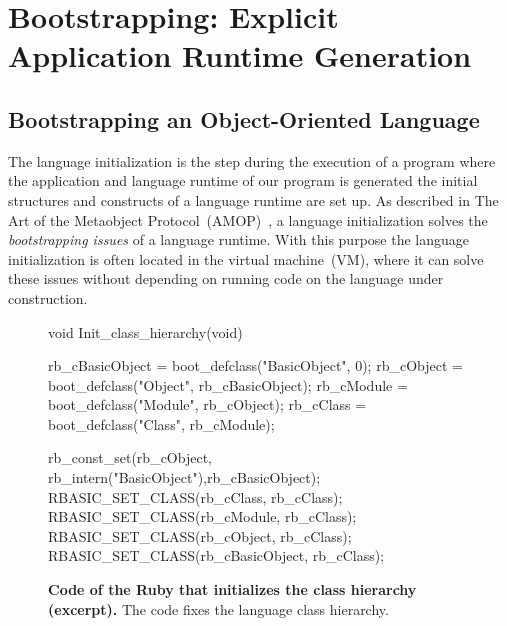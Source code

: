 
\part{Bootstrapping: Explicit Application Runtime Generation}
\chapter{Bootstrapping an Object-Oriented Language}
\introduction

The language initialization is the step during the execution of a program where the application and language runtime of our program is generated \ie the initial structures and constructs of a language runtime are set up.
As described in The Art of the Metaobject Protocol~(AMOP)~\cite{Kicz91a}, a language initialization solves the \emph{bootstrapping issues} of a language runtime. With this purpose the language initialization is often located in the virtual machine~(VM), where it can solve these issues without depending on running code on the language under construction.

\begin{figure}[ht!]
\begin{code}
void Init_class_hierarchy(void) {
    rb_cBasicObject = boot_defclass("BasicObject", 0);
    rb_cObject = boot_defclass("Object", rb_cBasicObject);
    rb_cModule = boot_defclass("Module", rb_cObject);
    rb_cClass =  boot_defclass("Class",  rb_cModule);

    rb_const_set(rb_cObject, rb_intern("BasicObject"),rb_cBasicObject);
    RBASIC_SET_CLASS(rb_cClass, rb_cClass);
    RBASIC_SET_CLASS(rb_cModule, rb_cClass);
    RBASIC_SET_CLASS(rb_cObject, rb_cClass);
    RBASIC_SET_CLASS(rb_cBasicObject, rb_cClass);
}
\end{code}
\caption{\textbf{Code of the Ruby \VM that initializes the class hierarchy (excerpt).} The \VM code fixes the language class hierarchy.\label{code:ruby_hierarchy}}
\end{figure}

